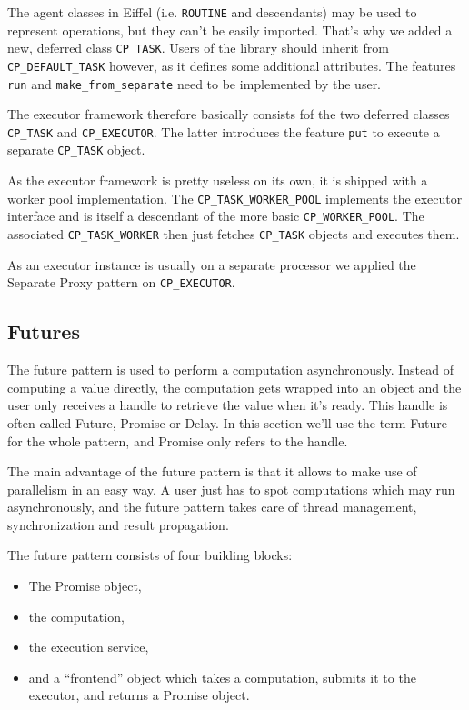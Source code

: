 The agent classes in Eiffel (i.e. \lstinline!ROUTINE! and descendants) may be used to represent operations, but they can't be easily imported.
That's why we added a new, deferred class \lstinline!CP_TASK!.
Users of the library should inherit from \lstinline!CP_DEFAULT_TASK! however, as it defines some additional attributes.
The features \lstinline!run! and \lstinline!make_from_separate! need to be implemented by the user.

The executor framework therefore basically consists fof the two deferred classes \lstinline!CP_TASK! and \lstinline!CP_EXECUTOR!.
The latter introduces the feature \lstinline!put! to execute a separate \lstinline!CP_TASK! object.


As the executor framework is pretty useless on its own, it is shipped with a worker pool implementation.
The \lstinline!CP_TASK_WORKER_POOL! implements the executor interface and is itself a descendant of the more basic \lstinline!CP_WORKER_POOL!.
The associated \lstinline!CP_TASK_WORKER! then just fetches \lstinline!CP_TASK! objects and executes them.

As an executor instance is usually on a separate processor we applied the Separate Proxy pattern on \lstinline!CP_EXECUTOR!.


\subsection{Futures}
\label{sec:futures}

The future pattern is used to perform a computation asynchronously.
Instead of computing a value directly, the computation gets wrapped into an object and the user only receives a handle to retrieve the value when it's ready.
This handle is often called Future, Promise or Delay.
In this section we'll use the term Future for the whole pattern, and Promise only refers to the handle.

The main advantage of the future pattern is that it allows to make use of parallelism in an easy way.
A user just has to spot computations which may run asynchronously, and the future pattern takes care of thread management, synchronization and result propagation.

The future pattern consists of four building blocks:
\begin{itemize}
 \item The Promise object,
 \item the computation,
 \item the execution service,
 \item and a ``frontend'' object which takes a computation, submits it to the executor, and returns a Promise object.
\end{itemize}

